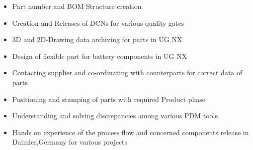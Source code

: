 \documentclass[10pt,a4paper]{altacv}
\begin{document}

\begin{fullwidth}
\makecvheader
\end{fullwidth}


\begin{itemize}
\item Part number and BOM Structure creation 
\item Creation and Releases of DCNs for various quality gates
\item 3D and 2D-Drawing data archiving for parts in UG NX
\item Design of flexible part for battery components in UG NX
\item Contacting supplier and co-ordinating with counterparts for correct data of parts
\item Positioning and stamping of parts with required Product phase
\item Understanding and solving discrepancies among various PDM tools
\item Hands on experience of the process flow and concerned components release in Daimler,Germany for various projects
\end{itemize}
\medskip

\divider
\medskip
\end{document}
